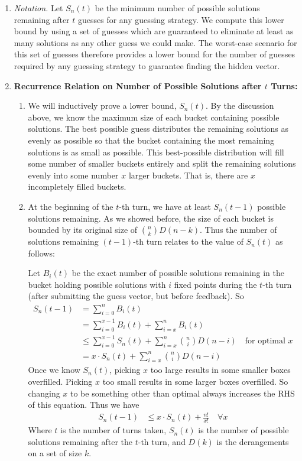 \documentclass[12pt, a4paper]{article}
\begin{document}
\begin{enumerate}
	\item\textit{Notation.}
	Let $S_{n}(t)$ be the minimum number of possible solutions remaining
	after $t$ guesses for any guessing strategy. We compute this lower bound by using
	a set of guesses which are guaranteed to eliminate at least as many solutions
	as any other guess we could make. The worst-case scenario for this set of guesses
	therefore provides a lower bound for the number of guesses required by any
	guessing strategy to guarantee finding the hidden vector.
	
	\item\textbf{Recurrence Relation on Number of Possible Solutions after $t$ Turns:}
		\begin{enumerate}
		\item We will inductively prove a lower bound, $S_{n}(t)$. By the
		discussion above,
		we know the maximum size of each bucket containing possible solutions.
		The best possible guess distributes the remaining solutions as evenly as
		possible so that the bucket containing the most remaining solutions is as
		small as possible. This best-possible distribution will fill some number of
		smaller buckets entirely and split the remaining solutions evenly
		into some number $x$ larger buckets. That is, there are $x$ incompletely
		filled buckets.
		
		\item At the beginning of the $t$-th turn, we have at least $S_{n}(t-1)$
		possible
		solutions remaining. As we showed before, the size of each bucket is bounded
		by its original size of $\binom{n}{k}D(n-k)$. Thus the number of solutions
		remaining $(t-1)$-th turn relates to the value of $S_{n}(t)$ as follows:
		
		Let $B_i(t)$ be the exact number of possible solutions remaining in the
		bucket holding possible solutions with $i$ fixed points during the
		$t$-th turn (after submitting the guess vector, but before feedback). So
		\begin{align*}
		S_{n}(t-1) & = \sum_{i = 0}^{n}B_i(t)\\
		& = \sum_{i=0}^{x-1}B_i(t) + \sum_{i=x}^{n}B_i(t)\\
		& \le \sum_{i = 0}^{x-1}S_n(t) + \sum_{i=x}^{n}\binom{n}{i}D(n-i)\quad
		\text{for optimal $x$}\\
		& = x\cdot S_{n}(t) + \sum_{i = x}^{n}\binom{n}{i}D(n-i)
		\end{align*}
		Once we know $S_{n}(t)$, picking $x$ too large results in some smaller boxes
		overfilled. Picking $x$ too small results in some larger boxes overfilled. So
		changing $x$ to be something other than optimal always increases the RHS
		of this equation. Thus we have
		\begin{align*}
		S_{n}(t-1) & \le x\cdot S_{n}(t) + \frac{n!}{x!}\quad\forall x
		\end{align*}
		Where $t$ is the number of turns taken, $S_{n}(t)$ is the number of possible
		solutions remaining after the $t$-th turn, and $D(k)$ is the derangements
		on a set of size $k$.
		\end{enumerate}
		

\end{enumerate}
\end{document}
